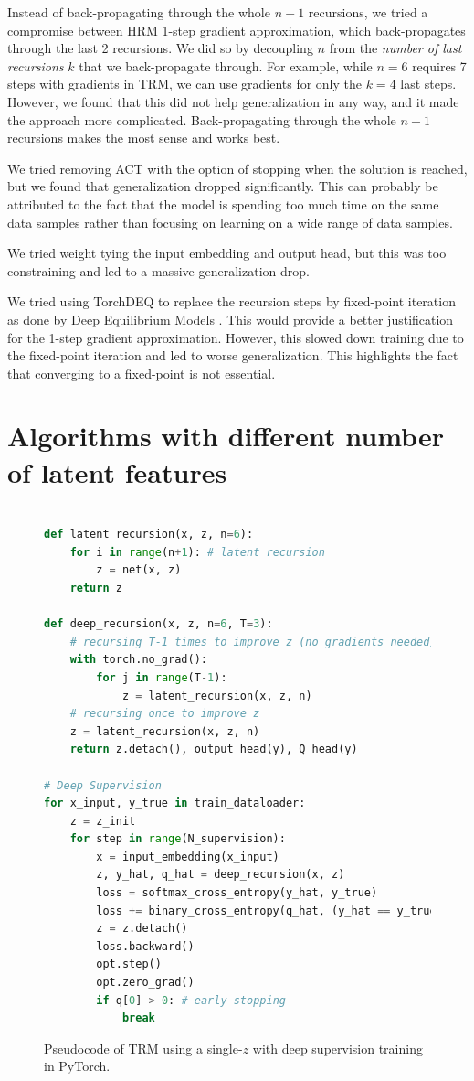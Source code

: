 \documentclass{article}
\theoremstyle{plain}
\theoremstyle{definition}
\theoremstyle{remark}
\begin{document}
Instead of back-propagating through the whole $n+1$ recursions, we tried a compromise between HRM 1-step gradient approximation, which back-propagates through the last 2 recursions. We did so by decoupling $n$ from the \emph{number of last recursions} $k$ that we back-propagate through. For example, while $n=6$ requires 7 steps with gradients in TRM, we can use gradients for only the $k=4$ last steps. However, we found that this did not help generalization in any way, and it made the approach more complicated. Back-propagating through the whole $n+1$ recursions makes the most sense and works best.

We tried removing ACT with the option of stopping when the solution is reached, but we found that generalization dropped significantly. This can probably be attributed to the fact that the model is spending too much time on the same data samples rather than focusing on learning on a wide range of data samples.

We tried weight tying the input embedding and output head, but this was too constraining and led to a massive generalization drop.

We tried using TorchDEQ \citep{geng2023torchdeq} to replace the recursion steps by fixed-point iteration as done by Deep Equilibrium Models \citep{bai2019deep}. This would provide a better justification for the 1-step gradient approximation. However, this slowed down training due to the fixed-point iteration and led to worse generalization. This highlights the fact that converging to a fixed-point is not essential.

\clearpage

\section*{Algorithms with different number of latent features}

\begin{figure}[H]
  \centering
    \begin{lstlisting}[language=python]

def latent_recursion(x, z, n=6):
    for i in range(n+1): # latent recursion
        z = net(x, z)
    return z
    
def deep_recursion(x, z, n=6, T=3):
    # recursing T-1 times to improve z (no gradients needed)
    with torch.no_grad():
        for j in range(T-1):
            z = latent_recursion(x, z, n)
    # recursing once to improve z
    z = latent_recursion(x, z, n)
    return z.detach(), output_head(y), Q_head(y)

# Deep Supervision
for x_input, y_true in train_dataloader:
    z = z_init
    for step in range(N_supervision):
        x = input_embedding(x_input)
        z, y_hat, q_hat = deep_recursion(x, z)
        loss = softmax_cross_entropy(y_hat, y_true)
        loss += binary_cross_entropy(q_hat, (y_hat == y_true))
        z = z.detach()
        loss.backward()
        opt.step()
        opt.zero_grad()
        if q[0] > 0: # early-stopping
            break
    \end{lstlisting}
  \caption{Pseudocode of TRM using a single-$z$ with deep supervision training in PyTorch.}
  \label{fig:pseudocode_single}
\end{figure}
\end{document}
